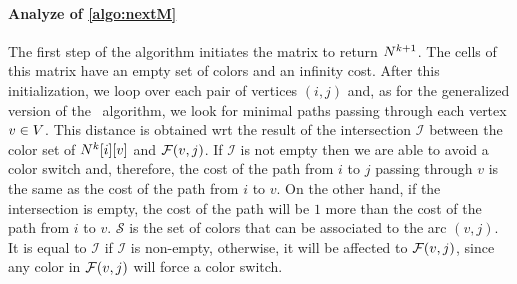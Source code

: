 \paragraph{Analyze of \cref{algo:nextM}}
The first step of the algorithm initiates the matrix to return $N^{k+1}$. The cells of this matrix have an empty set of colors and an infinity cost. After this initialization, we loop over each pair of vertices $(i, j)$ and, as for the generalized version of the \FW\ algorithm, we look for minimal paths passing through each vertex $v \in V$. This distance is obtained wrt the result of the intersection $\mathcal{I}$ between the color set of $N^k[i][v]$ and $\mathcal{F}(v,j)$. If $\mathcal{I}$ is not empty then we are able to avoid a color switch and, therefore, the cost of the path from $i$ to $j$ passing through $v$ is the same as the cost of the path from $i$ to $v$. On the other hand, if the intersection is empty, the cost of the path will be $1$ more than the cost of the path from $i$ to $v$. $\mathcal{S}$ is the set of colors that can be associated to the arc $(v,j)$. It is equal to $\mathcal{I}$ if $\mathcal{I}$ is non-empty, otherwise, it will be affected to $\mathcal{F}(v,j)$, since any color in $\mathcal{F}(v,j)$ will force a color switch.

